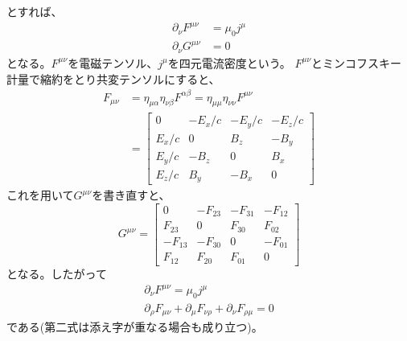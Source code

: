     とすれば、
    \begin{align*}
        \partial_\nu F^{\mu\nu} &= \mu_0 j^\mu\\
        \partial_\nu G^{\mu\nu} &= 0
    \end{align*}
    となる。$F^{\mu\nu}$を電磁テンソル、$j^\mu$を四元電流密度という。
    $F^{\mu\nu}$とミンコフスキー計量で縮約をとり共変テンソルにすると、
    \begin{align*}
        F_{\mu\nu} 
            &= \eta_{\mu\alpha}\eta_{\nu\beta}F^{\alpha\beta} = \eta_{\mu\mu}\eta_{\nu\nu}F^{\mu\nu}\\
            &= \begin{bmatrix}
                0 & -E_x / c & -E_y / c & -E_z / c\\
                E_x / c & 0 & B_z & -B_y\\
                E_y / c & -B_z & 0 & B_x\\
                E_z / c & B_y & -B_x & 0
            \end{bmatrix}
    \end{align*}
    これを用いて$G^{\mu\nu}$を書き直すと、
    \[
        G^{\mu\nu} =
        \begin{bmatrix}
            0 & -F_{23} & -F_{31} & -F_{12}\\
            F_{23} & 0 & F_{30} & F_{02}\\
            -F_{13} & -F_{30} & 0 & -F_{01}\\
            F_{12} & F_{20} & F_{01} & 0
        \end{bmatrix}
    \]
    となる。したがって
    \begin{gather*}
        \partial_\nu F^{\mu\nu} = \mu_0 j^\mu\\
        \partial_\rho F_{\mu\nu} + \partial_\mu F_{\nu\rho} + \partial_\nu F_{\rho\mu} = 0 \tag{ビアンキの恒等式}
    \end{gather*}
    である(第二式は添え字が重なる場合も成り立つ)。

